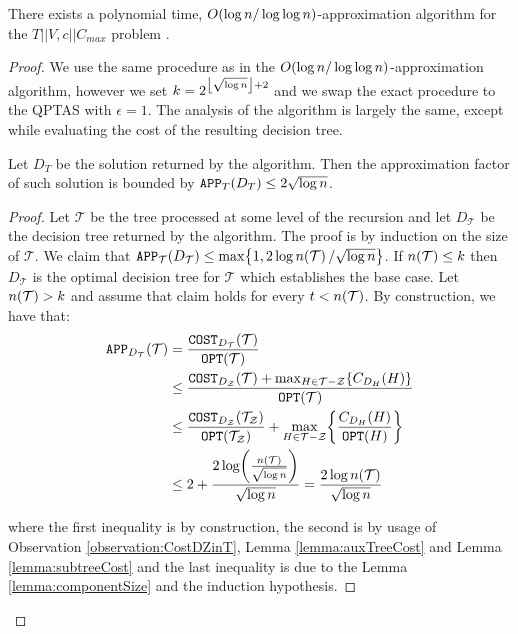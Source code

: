 \begin{theorem}
    There exists a polynomial time, $O\mathopen{}\left( \log n/\log\log n \right)$-approximation algorithm for the $T||V,c||C_{max}$ problem .
    \begin{proof}
    We use the same procedure as in the $O\mathopen{}\left( \log n/\log\log n \right)$-approximation algorithm, however we set $k=2^{\mathopen{}\left\lfloor \sqrt{\log n} \right\rfloor+2}$ and we swap the exact procedure to the QPTAS with $\epsilon=1$. The analysis of the algorithm is largely the same, except while evaluating the cost of the resulting decision tree.
    \begin{lemma}
        Let $D_T$ be the solution returned by the algorithm. Then the approximation factor of such solution is bounded by 
    $
    \texttt{APP}_T\mathopen{}\left( D_T \right)\leq 2\sqrt{\log n}
    $.
    \begin{proof}
        Let $\mathcal{T}$ be the tree processed at some level of the recursion and let $D_{\mathcal{T}}$ be the decision tree returned by the algorithm. The proof is by induction on the size of $\mathcal{T}$.  We claim that $\texttt{APP}_{\mathcal{T}}\mathopen{}\left( D_{\mathcal{T}} \right)\leq \max\mathopen{}\left\{ 1, 2\log n\mathopen{}\left( \mathcal{T} \right)/\sqrt{\log n} \right\}$. If $n\mathopen{}\left( \mathcal{T} \right)\leq k$ then $D_{\mathcal{T}}$ is the optimal decision tree for $\mathcal{T}$ which establishes the base case. Let $n\mathopen{}\left( \mathcal{T} \right) > k$ and assume that claim holds for every $t< n\mathopen{}\left( \mathcal{T} \right)$. 
        By construction, we have that:
        \begin{align*}
        \texttt{APP}_{D_{\mathcal{T}}}\mathopen{}\left( \mathcal{T} \right)&=\frac{\texttt{COST}_{D_{\mathcal{T}}}\mathopen{}\left( \mathcal{T} \right)}{\texttt{OPT}\mathopen{}\left( \mathcal{T} \right)}\\
        &\leq \frac{\texttt{COST}_{D_{\mathcal{Z}}}\mathopen{}\left( \mathcal{T} \right)+\max_{H\in \mathcal{T}-\mathcal{Z}}\mathopen{}\left\{ C_{D_H}\mathopen{}\left( H \right) \right\}}{\texttt{OPT}\mathopen{}\left( \mathcal{T} \right)}\\
        &\leq \frac{\texttt{COST}_{D_{\mathcal{Z}}}\mathopen{}\left( \mathcal{T}_{\mathcal{Z}} \right)}{\texttt{OPT}\mathopen{}\left( \mathcal{T}_{\mathcal{Z}} \right)}+\max_{H\in \mathcal{T}-\mathcal{Z}}\mathopen{}\left\{ \frac{C_{D_H}\mathopen{}\left( H \right)}{\texttt{OPT}\mathopen{}\left( H \right)} \right\}\\
        &\leq 2+\frac{2\log\mathopen{}\left( \frac{n\mathopen{}\left( \mathcal{T} \right)}{\sqrt{\log n}} \right)}{\sqrt{\log n}}= \frac{2\log n\mathopen{}\left( \mathcal{T} \right)}{\sqrt{\log n}}
        \end{align*}
        
        where the first inequality is by construction, the second is by usage of Observation \ref{observation:CostDZinT}, Lemma \ref{lemma:auxTreeCost} and Lemma \ref{lemma:subtreeCost} and the last inequality is due to the Lemma \ref{lemma:componentSize} and the induction hypothesis.
    \end{proof}
\end{lemma}
    \end{proof}
\end{theorem}
